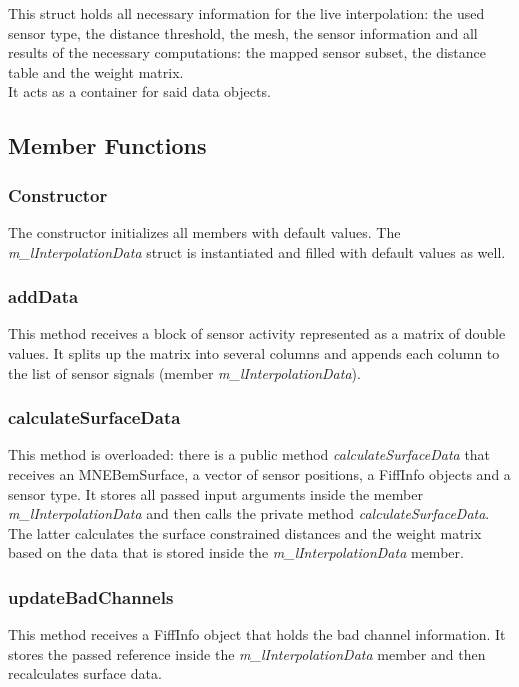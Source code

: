 This struct holds all necessary information for the live interpolation: the used sensor type, the distance threshold, the mesh, the sensor information and all results of the necessary computations: the mapped sensor subset, the distance table and the weight matrix.\\
It acts as a container for said data objects.

\subsection{Member Functions}

\subsubsection{Constructor}

The constructor initializes all members with default values. The \textit{m\_lInterpolationData} struct is instantiated and filled with default values as well.

\subsubsection{addData}

This method receives a block of sensor activity represented as a matrix of double values. It splits up the matrix into several columns and appends each column to the list of sensor signals (member \textit{m\_lInterpolationData}).

\subsubsection{calculateSurfaceData}

This method is overloaded: there is a public method \textit{calculateSurfaceData} that receives an MNEBemSurface, a vector of sensor positions, a FiffInfo objects and a sensor type. It stores all passed input arguments inside the member \textit{m\_lInterpolationData} and then calls the private method \textit{calculateSurfaceData}. The latter calculates the surface constrained distances and the weight matrix based on the data that is stored inside the \textit{m\_lInterpolationData} member. 

\subsubsection{updateBadChannels}

This method receives a FiffInfo object that holds the bad channel information. It stores the passed reference inside the \textit{m\_lInterpolationData} member and then recalculates surface data.

